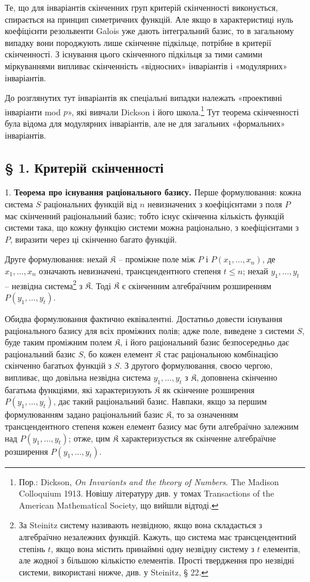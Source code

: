 \documentclass[11pt]{article}
\begin{document}
Те, що для інваріантів скінченних груп критерій скінченності виконується, спирається на принцип симетричних функцій. Але якщо в характеристиці нуль коефіцієнти резольвенти Galois уже дають інтегральний базис, то в загальному випадку вони породжують лише скінченне підкільце, потрібне в критерії скінченності. З існування цього скінченного підкільця за тими самими міркуваннями випливає скінченність «відносних» інваріантів і «модулярних» інваріантів.

До розглянутих тут інваріантів як спеціальні випадки належать «проективні інваріанти mod $p$», які вивчали Dickson і його школа.\footnote{Пор.: Dickson, \emph{On Invariants and the theory of Numbers}. The Madison Colloquium 1913. Новішу літературу див. у томах Transactions of the American Mathematical Society, що вийшли відтоді.} Тут теорема скінченності була відома для модулярних інваріантів, але не для загальних «формальних» інваріантів.

\subsection*{§ 1. Критерій скінченності}

1. \textbf{Теорема про існування раціонального базису.} Перше формулювання: кожна система $S$ раціональних функцій від $n$ невизначених з коефіцієнтами з поля $P$ має скінченний раціональний базис; тобто існує скінченна кількість функцій системи така, що кожну функцію системи можна раціонально, з коефіцієнтами з $P$, виразити через ці скінченно багато функцій.

Друге формулювання: нехай $\mathfrak K$ -- проміжне поле між $P$ і $P(x_1,\ldots,x_n)$, де $x_1,\ldots,x_n$ означають невизначені, трансцендентного степеня $t\leq n$; нехай $y_1,\ldots,y_t$ -- незвідна система\footnote{За Steinitz систему називають незвідною, якщо вона складається з алгебраїчно незалежних функцій. Кажуть, що система має трансцендентний степінь $t$, якщо вона містить принаймні одну незвідну систему з $t$ елементів, але жодної з більшою кількістю елементів. Прості твердження про незвідні системи, використані нижче, див. у Steinitz, § 22.} з $\mathfrak K$. Тоді $\mathfrak K$ є скінченним алгебраїчним розширенням $P(y_1,\ldots,y_t)$.

Обидва формулювання фактично еквівалентні. Достатньо довести існування раціонального базису для всіх проміжних полів; адже поле, виведене з системи $S$, буде таким проміжним полем $\mathfrak K$, і його раціональний базис безпосередньо дає раціональний базис $S$, бо кожен елемент $\mathfrak K$ стає раціональною комбінацією скінченно багатьох функцій з $S$. З другого формулювання, своєю чергою, випливає, що довільна незвідна система $y_1,\ldots,y_t$ з $\mathfrak K$, доповнена скінченно багатьма функціями, які характеризують $\mathfrak K$ як скінченне розширення $P(y_1,\ldots,y_t)$, дає такий раціональний базис. Навпаки, якщо за першим формулюванням задано раціональний базис $\mathfrak K$, то за означенням трансцендентного степеня кожен елемент базису має бути алгебраїчно залежним над $P(y_1,\ldots,y_t)$; отже, цим $\mathfrak K$ характеризується як скінченне алгебраїчне розширення $P(y_1,\ldots,y_t)$.
\end{document}
